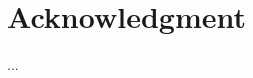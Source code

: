 \documentclass[conference]{IEEEtran}
\begin{document}


\section*{Acknowledgment}

...




%
%
%
%





\end{document}
